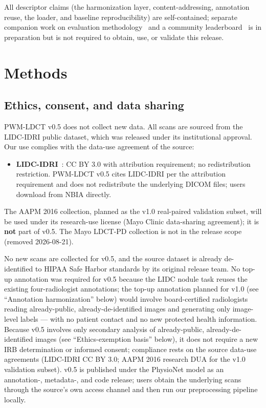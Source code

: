 \documentclass[twoside,11pt]{article}
\begin{document}
All descriptor claims (the harmonization layer, content-addressing, annotation reuse, the loader, and baseline reproducibility) are self-contained; separate companion work on evaluation methodology~\citep{ws2framework,ws3reference} and a community leaderboard~\citep{ws4leaderboard} is in preparation but is not required to obtain, use, or validate this release.

\section*{Methods}

\subsection*{Ethics, consent, and data sharing}

PWM-LDCT v0.5 does not collect new data. All scans are sourced from the LIDC-IDRI public dataset, which was released under its institutional approval. Our use complies with the data-use agreement of the source:

\begin{itemize}
    \item \textbf{LIDC-IDRI}~\citep{lidc_idri}: CC BY 3.0 with attribution requirement; no redistribution restriction. PWM-LDCT v0.5 cites LIDC-IDRI per the attribution requirement and does not redistribute the underlying DICOM files; users download from NBIA directly.
\end{itemize}

The AAPM 2016 collection, planned as the v1.0 real-paired validation subset, will be used under its research-use license (Mayo Clinic data-sharing agreement); it is \textbf{not} part of v0.5. The Mayo LDCT-PD collection is not in the release scope (removed 2026-08-21).

No new scans are collected for v0.5, and the source dataset is already de-identified to HIPAA Safe Harbor standards by its original release team. No top-up annotation was required for v0.5 because the LIDC nodule task reuses the existing four-radiologist annotations; the top-up annotation planned for v1.0 (see ``Annotation harmonization'' below) would involve board-certified radiologists reading already-public, already-de-identified images and generating only image-level labels --- with no patient contact and no new protected health information. Because v0.5 involves only secondary analysis of already-public, already-de-identified images (see ``Ethics-exemption basis'' below), it does not require a new IRB determination or informed consent; compliance rests on the source data-use agreements (LIDC-IDRI CC BY 3.0; AAPM 2016 research DUA for the v1.0 validation subset). v0.5 is published under the PhysioNet model as an annotation-, metadata-, and code release; users obtain the underlying scans through the source's own access channel and then run our preprocessing pipeline locally.
\end{document}
